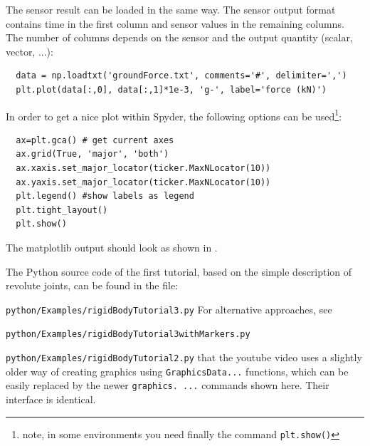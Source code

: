 The sensor result can be loaded in the same way. The sensor output format contains time in the first column and sensor values in the remaining columns. The number of columns depends on the 
sensor and the output quantity (scalar, vector, ...):
\pythonstyle\begin{lstlisting}
  data = np.loadtxt('groundForce.txt', comments='#', delimiter=',')
  plt.plot(data[:,0], data[:,1]*1e-3, 'g-', label='force (kN)')
\end{lstlisting}
%
In order to get a nice plot within Spyder, the following options can be used\footnote{note, in some environments you need finally the command \texttt{plt.show()}}:
\pythonstyle\begin{lstlisting}
  ax=plt.gca() # get current axes
  ax.grid(True, 'major', 'both')
  ax.xaxis.set_major_locator(ticker.MaxNLocator(10))
  ax.yaxis.set_major_locator(ticker.MaxNLocator(10))
  plt.legend() #show labels as legend
  plt.tight_layout()
  plt.show() 
\end{lstlisting}
%
The matplotlib output should look as shown in .
%
%
%
%
%



\newpage
{}
The Python source code of the first tutorial, based on the simple description of revolute joints, can be found in the file:
\bi
  \item[] \texttt{python/Examples/rigidBodyTutorial3.py}
\ei
For alternative approaches, see
\bi
  \item[] \texttt{python/Examples/rigidBodyTutorial3withMarkers.py}
  \item[] \texttt{python/Examples/rigidBodyTutorial2.py}
\ei
{} that the youtube video uses a slightly older way of creating graphics using \texttt{GraphicsData...} functions, which
can be easily replaced by the newer \texttt{graphics. ...} commands shown here. Their interface is identical.

